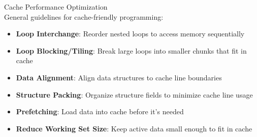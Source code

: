 \begin{concept}{Cache Performance Optimization}\\
General guidelines for cache-friendly programming:
\begin{itemize}
    \item \textbf{Loop Interchange}: Reorder nested loops to access memory sequentially
    \item \textbf{Loop Blocking/Tiling}: Break large loops into smaller chunks that fit in cache
    \item \textbf{Data Alignment}: Align data structures to cache line boundaries
    \item \textbf{Structure Packing}: Organize structure fields to minimize cache line usage
    \item \textbf{Prefetching}: Load data into cache before it's needed
    \item \textbf{Reduce Working Set Size}: Keep active data small enough to fit in cache
\end{itemize}
\end{concept}


